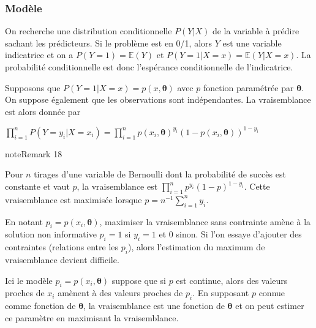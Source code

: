 \documentclass[letterpaper,10pt,french]{sphinxmanual}
\begin{document}
\subsubsection{Modèle}
\label{\detokenize{regression:id2}}
\sphinxAtStartPar
On recherche une distribution conditionnelle \(P(Y|X)\) de la variable à prédire sachant les prédicteurs. Si le problème est en 0/1, alors \(Y\) est une variable indicatrice et on a \(P(Y=1)=\mathbb{E}(Y)\) et \(P(Y=1|X=x)=\mathbb{E}(Y|X=x)\). La probabilité conditionnelle est donc l’espérance conditionnelle de l’indicatrice.

\sphinxAtStartPar
Supposons que \(P(Y=1|X=x)=p(x,\boldsymbol\theta)\) avec \(p\) fonction paramétrée par \(\boldsymbol\theta\). On suppose également que les observations sont indépendantes. La vraisemblance est alors donnée par

\sphinxAtStartPar
\(\displaystyle\prod_{i=1}^n P(Y=y_i|X=x_i) = \displaystyle\prod_{i=1}^n p(x_i,\boldsymbol\theta)^{y_i}(1-p(x_i,\boldsymbol\theta))^{1-y_i}\)
\label{regression:remark-6}
\begin{sphinxadmonition}{note}{Remark 18}



\sphinxAtStartPar
Pour \(n\) tirages d’une variable de Bernoulli dont la probabilité de succès est constante et vaut \(p\), la vraisemblance est \(\displaystyle\prod_{i=1}^n p^{y_i}(1-p)^{1-y_i}\). Cette vraisemblance est maximisée lorsque
\(p=n^{-1}\displaystyle\sum_{i=1}^n y_i\).
\end{sphinxadmonition}

\sphinxAtStartPar
En notant \(p_i=p(x_i,\boldsymbol\theta)\), maximiser la vraisemblance sans contrainte amène à la solution non informative \(p_i=1\) si \(y_i=1\) et 0 sinon. Si l’on essaye d’ajouter des contraintes (relations entre les \(p_i\)), alors l’estimation du maximum de vraisemblance devient difficile.

\sphinxAtStartPar
Ici le modèle  \(p_i=p(x_i,\boldsymbol\theta)\) suppose que si \(p\) est continue, alors des valeurs proches de \(x_i\) amènent à des valeurs proches de \(p_i\). En supposant \(p\) connue comme fonction de \(\boldsymbol\theta\), la vraisemblance est une fonction de \(\boldsymbol\theta\) et on peut estimer ce paramètre en maximisant la vraisemblance.
\end{document}
